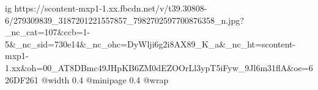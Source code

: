  
 
 
 
 

\ifcmt
  ig https://scontent-mxp1-1.xx.fbcdn.net/v/t39.30808-6/279309839_3187201221557857_7982702597700876358_n.jpg?_nc_cat=107&ccb=1-5&_nc_sid=730e14&_nc_ohc=DyWlji6g2i8AX89_K_a&_nc_ht=scontent-mxp1-1.xx&oh=00_AT8DBmc49JHpKB6ZM0dEZOOrLl3ypT5iFyw_9Jl6m31flA&oe=626DF261
  @width 0.4
  @minipage 0.4
  @wrap \parpic[r]
\fi
